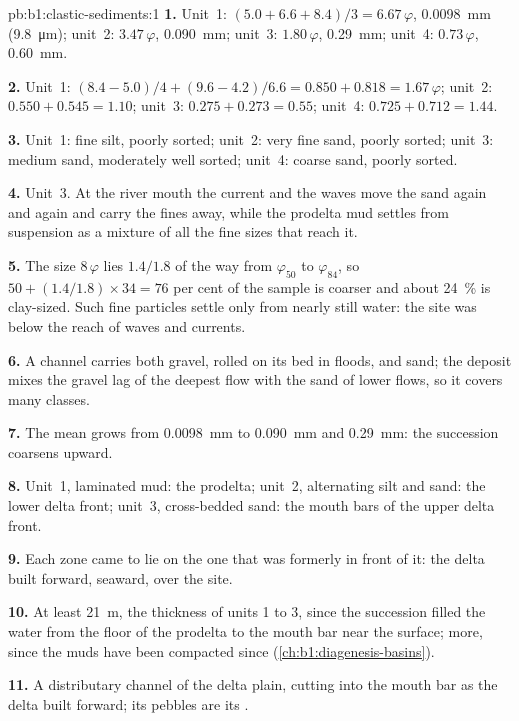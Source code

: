 \begin{solution}{pb:b1:clastic-sediments:1}
\textbf{1.} Unit~1: $(5.0 + 6.6 + 8.4)/3 = 6.67\,\varphi$, \qty{0.0098}{mm}
(\qty{9.8}{\micro m}); unit~2: $3.47\,\varphi$, \qty{0.090}{mm}; unit~3:
$1.80\,\varphi$, \qty{0.29}{mm}; unit~4: $0.73\,\varphi$, \qty{0.60}{mm}.

\textbf{2.} Unit~1: $(8.4 - 5.0)/4 + (9.6 - 4.2)/6.6 = 0.850 + 0.818 =
1.67\,\varphi$; unit~2: $0.550 + 0.545 = 1.10$; unit~3: $0.275 + 0.273 = 0.55$;
unit~4: $0.725 + 0.712 = 1.44$.

\textbf{3.} Unit~1: fine silt, poorly sorted; unit~2: very fine sand, poorly
sorted; unit~3: medium sand, moderately well sorted; unit~4: coarse sand,
poorly sorted.

\textbf{4.} Unit~3. At the river mouth the current and the waves move the sand
again and again and carry the fines away, while the prodelta mud settles from
suspension as a mixture of all the fine sizes that reach it.

\textbf{5.} The size $8\,\varphi$ lies $1.4/1.8$ of the way from
$\varphi_{50}$ to $\varphi_{84}$, so $50 + (1.4/1.8) \times 34 = 76$ per cent of
the sample is coarser and about \qty{24}{\percent} is clay-sized. Such fine
particles settle only from nearly still water: the site was below the reach of
waves and currents.

\textbf{6.} A channel carries both gravel, rolled on its bed in floods, and
sand; the deposit mixes the gravel lag of the deepest flow with the sand of
lower flows, so it covers many classes.

\textbf{7.} The mean grows from \qty{0.0098}{mm} to \qty{0.090}{mm} and
\qty{0.29}{mm}: the succession coarsens upward.

\textbf{8.} Unit~1, laminated mud: the prodelta; unit~2, alternating silt and
sand: the lower delta front; unit~3, cross-bedded sand: the mouth bars of the
upper delta front.

\textbf{9.} Each zone came to lie on the one that was formerly in front of it:
the delta built forward, seaward, over the site.

\textbf{10.} At least \qty{21}{m}, the thickness of units 1 to 3, since the
succession filled the water from the floor of the prodelta to the mouth bar
near the surface; more, since the muds have been compacted since
(\cref{ch:b1:diagenesis-basins}).

\textbf{11.} A distributary channel of the delta plain, cutting into the mouth
bar as the delta built forward; its pebbles are its .


\end{solution}
